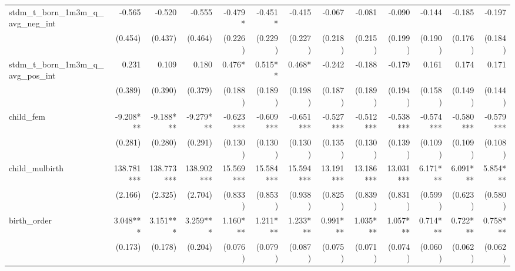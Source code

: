 \begin{tabular}{lrrrrrrrrrrrr}
stdm\_t\_born\_1m3m\_q\_avg\_neg\_int       &       -0.565 &       -0.520 &       -0.555 &      -0.479* &      -0.451* &       -0.415 &       -0.067 &       -0.081 &       -0.090 &       -0.144 &       -0.185 &       -0.197 \\ 
                                            &      (0.454) &      (0.437) &      (0.464) &      (0.226) &      (0.229) &      (0.227) &      (0.218) &      (0.215) &      (0.199) &      (0.190) &      (0.176) &      (0.184) \\ 
stdm\_t\_born\_1m3m\_q\_avg\_pos\_int       &        0.231 &        0.109 &        0.180 &       0.476* &      0.515** &       0.468* &       -0.242 &       -0.188 &       -0.179 &        0.161 &        0.174 &        0.171 \\ 
                                            &      (0.389) &      (0.390) &      (0.379) &      (0.188) &      (0.189) &      (0.198) &      (0.187) &      (0.189) &      (0.194) &      (0.158) &      (0.149) &      (0.144) \\ 
child\_fem                                  &    -9.208*** &    -9.188*** &    -9.279*** &    -0.623*** &    -0.609*** &    -0.651*** &    -0.527*** &    -0.512*** &    -0.538*** &    -0.574*** &    -0.580*** &    -0.579*** \\ 
                                            &      (0.281) &      (0.280) &      (0.291) &      (0.130) &      (0.130) &      (0.130) &      (0.135) &      (0.130) &      (0.139) &      (0.109) &      (0.109) &      (0.108) \\ 
child\_mulbirth                             &   138.781*** &   138.773*** &   138.902*** &    15.569*** &    15.584*** &    15.594*** &    13.191*** &    13.186*** &    13.031*** &     6.171*** &     6.091*** &     5.854*** \\ 
                                            &      (2.166) &      (2.325) &      (2.704) &      (0.833) &      (0.853) &      (0.938) &      (0.825) &      (0.839) &      (0.831) &      (0.599) &      (0.623) &      (0.580) \\ 
birth\_order                                &     3.048*** &     3.151*** &     3.259*** &     1.160*** &     1.211*** &     1.233*** &     0.991*** &     1.035*** &     1.057*** &     0.714*** &     0.722*** &     0.758*** \\ 
                                            &      (0.173) &      (0.178) &      (0.204) &      (0.076) &      (0.079) &      (0.087) &      (0.075) &      (0.071) &      (0.074) &      (0.060) &      (0.062) &      (0.062) \\ 

\end{tabular}
